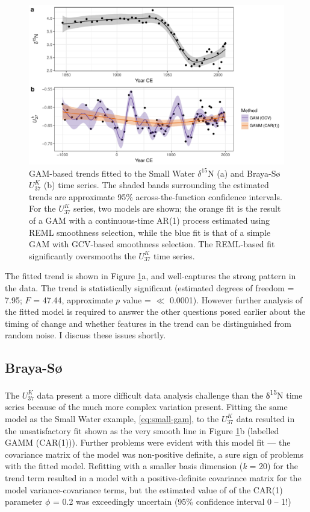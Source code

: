 \documentclass[12pt,]{article}
\newcommand{\uk}{\ensuremath{\mathit{U}^{\mathit{K}}_{\mathup{37}}}}
\begin{document}
\begin{figure}

{\centering \includegraphics[width=0.8\linewidth]{manuscript_files/figure-latex/plot-fitted-models-1} 

}

\caption{GAM-based trends fitted to the Small Water $\delta^{15}\text{N}$ (a) and Braya-Sø \uk{} (b) time series. The shaded bands surrounding the estimated trends are approximate 95\% across-the-function confidence intervals. For the \uk{} series, two models are shown; the orange fit is the result of a GAM with a continuous-time AR(1) process estimated using REML smoothness selection, while the blue fit is that of a simple GAM with GCV-based smoothness selection. The REML-based fit significantly oversmooths the \uk{} time series.}\label{fig:plot-fitted-models}
\end{figure}

The fitted trend is shown in Figure \ref{fig:plot-fitted-models}a, and
well-captures the strong pattern in the data. The trend is statistically
significant (estimated degrees of freedom = 7.95; \(F\) = 47.44,
approximate \(p\) value = \(\ll\) 0.0001). However further analysis of
the fitted model is required to answer the other questions posed earlier
about the timing of change and whether features in the trend can be
distinguished from random noise. I discuss these issues shortly.

\subsection{Braya-Sø}\label{braya-s}

The \uk{} data present a more difficult data analysis challenge than the
δ\textsuperscript{15}N time series because of the much more complex
variation present. Fitting the same model as the Small Water example,
\eqref{eq:small-gam}, to the \uk{} data resulted in the unsatisfactory
fit shown as the very smooth line in Figure
\ref{fig:plot-fitted-models}b (labelled GAMM (CAR(1))). Further problems
were evident with this model fit --- the covariance matrix of the model
was non-positive definite, a sure sign of problems with the fitted
model. Refitting with a smaller basis dimension (\emph{k} = 20) for the
trend term resulted in a model with a positive-definite covariance
matrix for the model variance-covariance terms, but the estimated value
of of the CAR(1) parameter \(\phi\) = 0.2 was exceedingly uncertain
(95\% confidence interval 0 -- 1!)
\end{document}
